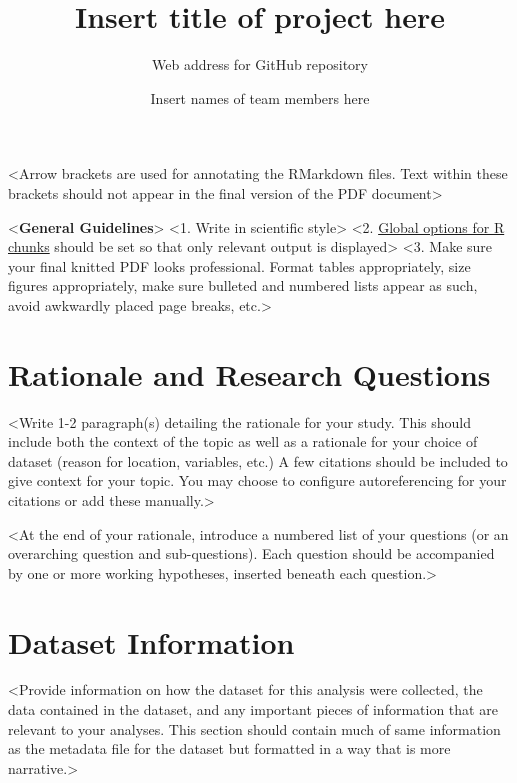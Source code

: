 \documentclass[12pt,]{article}
\title{Insert title of project here}
\subtitle{Web address for GitHub repository}
\author{Insert names of team members here}
\date{}
\begin{document}
\maketitle

\newpage

\textless{}Arrow brackets are used for annotating the RMarkdown files.
Text within these brackets should not appear in the final version of the
PDF document\textgreater{}

\textless{}\textbf{General Guidelines}\textgreater{} \textless{}1. Write
in scientific style\textgreater{} \textless{}2.
\href{https://rmarkdown.rstudio.com/lesson-3.html}{Global options for R
chunks} should be set so that only relevant output is
displayed\textgreater{} \textless{}3. Make sure your final knitted PDF
looks professional. Format tables appropriately, size figures
appropriately, make sure bulleted and numbered lists appear as such,
avoid awkwardly placed page breaks, etc.\textgreater{}

\hypertarget{rationale-and-research-questions}{%
\section{Rationale and Research
Questions}\label{rationale-and-research-questions}}

\textless{}Write 1-2 paragraph(s) detailing the rationale for your
study. This should include both the context of the topic as well as a
rationale for your choice of dataset (reason for location, variables,
etc.) A few citations should be included to give context for your topic.
You may choose to configure autoreferencing for your citations or add
these manually.\textgreater{}

\textless{}At the end of your rationale, introduce a numbered list of
your questions (or an overarching question and sub-questions). Each
question should be accompanied by one or more working hypotheses,
inserted beneath each question.\textgreater{}

\newpage

\hypertarget{dataset-information}{%
\section{Dataset Information}\label{dataset-information}}

\textless{}Provide information on how the dataset for this analysis were
collected, the data contained in the dataset, and any important pieces
of information that are relevant to your analyses. This section should
contain much of same information as the metadata file for the dataset
but formatted in a way that is more narrative.\textgreater{}
\end{document}
